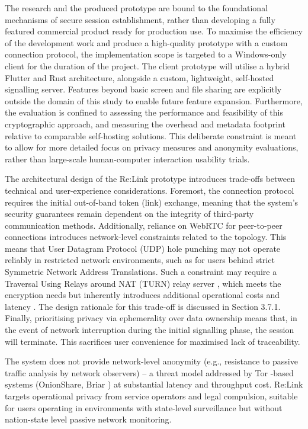 \documentclass[12pt,a4paper]{article}
\begin{document}
The research and the produced prototype are bound to the foundational mechanisms of secure session establishment, rather than developing a fully featured commercial product ready for production use. To maximise the efficiency of the development work and produce a high-quality prototype with a custom connection protocol, the implementation scope is targeted to a Windows-only client for the duration of the project. The client prototype will utilise a hybrid Flutter and Rust architecture, alongside a custom, lightweight, self-hosted signalling server. Features beyond basic screen and file sharing are explicitly outside the domain of this study to enable future feature expansion. Furthermore, the evaluation is confined to assessing the performance and feasibility of this cryptographic approach, and measuring the overhead and metadata footprint relative to comparable self-hosting solutions. This deliberate constraint is meant to allow for more detailed focus on privacy measures and anonymity evaluations, rather than large-scale human-computer interaction usability trials.

The architectural design of the Re:Link prototype introduces trade-offs between technical and user-experience considerations. Foremost, the connection protocol requires the initial out-of-band token (link) exchange, meaning that the system’s security guarantees remain dependent on the integrity of third-party communication methods. Additionally, reliance on WebRTC for peer-to-peer connections introduces network-level constraints related to the topology. This means that User Datagram Protocol (UDP) hole punching \cite{rfc5128} may not operate reliably in restricted network environments, such as for users behind strict Symmetric Network Address Translations. Such a constraint may require a Traversal Using Relays around NAT (TURN) relay server \cite{rfc8656}, which meets the encryption needs but inherently introduces additional operational costs and latency \cite{geantstun,rfc5389,ploswebrtc}. The design rationale for this trade-off is discussed in Section 3.7.1. Finally, prioritising privacy via ephemerality over data ownership means that, in the event of network interruption during the initial signalling phase, the session will terminate. This sacrifices user convenience for maximised lack of traceability.

The system does not provide network-level anonymity (e.g., resistance to passive traffic analysis by network observers) – a threat model addressed by Tor \cite{tor}-based systems (OnionShare, Briar \cite{briar}) at substantial latency and throughput cost. Re:Link targets operational privacy from service operators and legal compulsion, suitable for users operating in environments with state-level surveillance but without nation-state level passive network monitoring.
\end{document}
